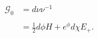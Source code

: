 \begin{equation}
\begin{aligned}
\mathcal{G}_{0}&=d\nu \nu ^{-1}\\
\\
&=\frac{1}{2}d\phi H+e^{\phi }d%
\chi E_{+}.
\end{aligned}
\end{equation}

